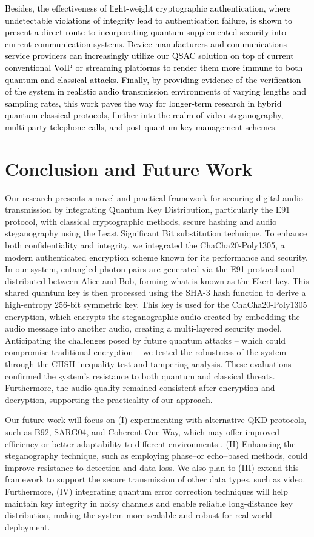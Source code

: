 \documentclass[a4paper]{cas-sc}
\begin{document}
\textcolor{black}{Besides, the effectiveness of light-weight cryptographic authentication, where undetectable violations of integrity lead to authentication failure, is shown to present a direct route to incorporating quantum-supplemented security into current communication systems. Device manufacturers and communications service providers can increasingly utilize our QSAC solution on top of current conventional VoIP or streaming platforms to render them more immune to both quantum and classical attacks. Finally, by providing evidence of the verification of the system in realistic audio transmission environments of varying lengths and sampling rates, this work paves the way for longer‑term research in hybrid quantum‑classical protocols, further into the realm of video steganography, multi‑party telephone calls, and post‑quantum key management schemes.}
\section{Conclusion and Future Work}
\label{sec:conclusion}
Our research presents a novel and practical framework for securing digital audio transmission by integrating Quantum Key Distribution, particularly the E91 protocol, with classical cryptographic methods, secure hashing and audio steganography using the Least Significant Bit substitution technique. To enhance both confidentiality and integrity, we integrated the ChaCha20-Poly1305, a modern authenticated encryption scheme known for its performance and security. In our system, entangled photon pairs are generated via the E91 protocol and distributed between Alice and Bob, forming what is known as the Ekert key. This shared quantum key is then processed using the SHA-3 hash function to derive a high-entropy 256-bit symmetric key. This key is used for the ChaCha20-Poly1305 encryption, which encrypts the steganographic audio created by embedding the audio message into another audio, creating a multi-layered security model. Anticipating the challenges posed by future quantum attacks -- which could compromise traditional encryption -- we tested the robustness of the system through the CHSH inequality test and tampering analysis. These evaluations confirmed the system's resistance to both quantum and classical threats. Furthermore, the audio quality remained consistent after encryption and decryption, supporting the practicality of our approach.

Our future work will focus on (I) experimenting with alternative QKD protocols, such as B92, SARG04, and Coherent One-Way, which may offer improved efficiency or better adaptability to different environments \cite{nurhadi2018quantum}. (II) Enhancing the steganography technique, such as employing phase--or echo--based methods, could improve resistance to detection and data loss. We also plan to (III) extend this framework to support the secure transmission of other data types, such as video. Furthermore, (IV) integrating quantum error correction techniques \cite{devitt2013quantum} will help maintain key integrity in noisy channels \cite{nagata2017quantum} and enable reliable long-distance key distribution, making the system more scalable and robust for real-world deployment.


\end{document}
